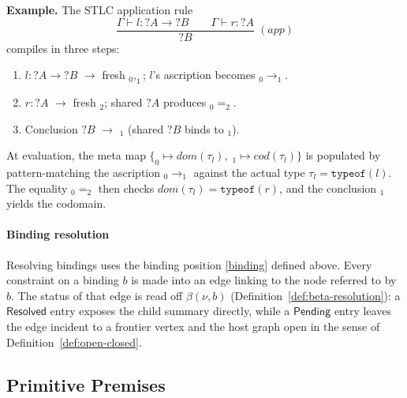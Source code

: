 \textbf{Example.}
The STLC application rule
\[
	\frac{\Gamma \vdash l : ?A \to ?B \qquad \Gamma \vdash r : ?A}{?B}\;(\mathit{app})
\]
compiles in three steps:
\begin{enumerate}
	\item $l : ?A \to ?B$ $\to$ fresh $_0, _1$; $l$'s ascription becomes $_0 \to _1$.
	\item $r : ?A$ $\to$ fresh $_2$; shared $?A$ produces $_0 = _2$.
	\item Conclusion $?B$ $\to$ $_1$ (shared $?B$ binds to $_1$).
\end{enumerate}
At evaluation, the meta map $\{_0\!\mapsto\!\mathit{dom}(\tau_l),\; _1\!\mapsto\!\mathit{cod}(\tau_l)\}$
is populated by pattern-matching the ascription $_0 \to _1$ against the actual
type $\tau_l = \texttt{typeof}(l)$.
The equality $_0 = _2$ then checks $\mathit{dom}(\tau_l) = \texttt{typeof}(r)$,
and the conclusion $_1$ yields the codomain.



\paragraph{Binding resolution} Resolving bindings uses the binding position \ref{binding} defined above. Every constraint on a binding $b$ is made into an edge linking to the node referred to by $b$. The status of that edge is read off $\beta(\nu,b)$ (Definition~\ref{def:beta-resolution}): a $\mathsf{Resolved}$ entry exposes the child summary directly, while a $\mathsf{Pending}$ entry leaves the edge incident to a frontier vertex and the host graph open in the sense of Definition~\ref{def:open-closed}.


\subsection*{Primitive Premises}

